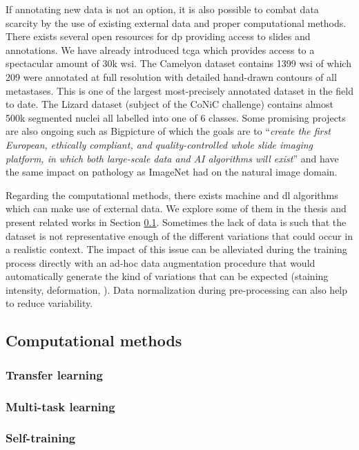 If annotating new data is not an option, it is also possible to combat data scarcity by the use of existing external data and proper computational methods. There exists several open resources for \acrlong{dp} \parencite{maree2019open} providing access to slides and annotations. We have already introduced \acrshort{tcga} which provides access to a spectacular amount of 30k \acrshort{wsi}. The Camelyon dataset \parencite{litjens2018camelyon} contains 1399 \acrshort{wsi} of which 209 were annotated at full resolution with detailed hand-drawn contours of all metastases. This is one of the largest most-precisely annotated dataset in the field to date. The Lizard dataset (subject of the CoNiC challenge) contains almost 500k segmented nuclei all labelled into one of 6 classes. Some promising projects are also ongoing such as Bigpicture \parencite{moulin2021imi} of which the goals are to ``\textit{create the first European, ethically compliant, and quality-controlled whole slide imaging platform, in which both large-scale data and AI algorithms will exist}'' and have the same impact on pathology as ImageNet had on the natural image domain. 

Regarding the computational methods, there exists machine and \acrlong{dl} algorithms which can make use of external data. We explore some of them in the thesis and present related works in Section \ref{ssec:backdp:compmethods}. Sometimes the lack of data is such that the dataset is not representative enough of the different variations that could occur in a realistic context. The impact of this issue can be alleviated during the training process directly with an ad-hoc data augmentation procedure that would automatically generate the kind of variations that can be expected (\eg staining intensity, deformation, \etc). Data normalization during pre-processing can also help to reduce variability. 



\subsection{Computational methods}
\label{ssec:backdp:compmethods}
\parencite{van2019strategies}


\subsubsection{Transfer learning}
\label{sssec:backdp:tl}

\subsubsection{Multi-task learning}
\label{sssec:backdp:mtl}

\subsubsection{Self-training}
\label{sssec:backdp:st}
